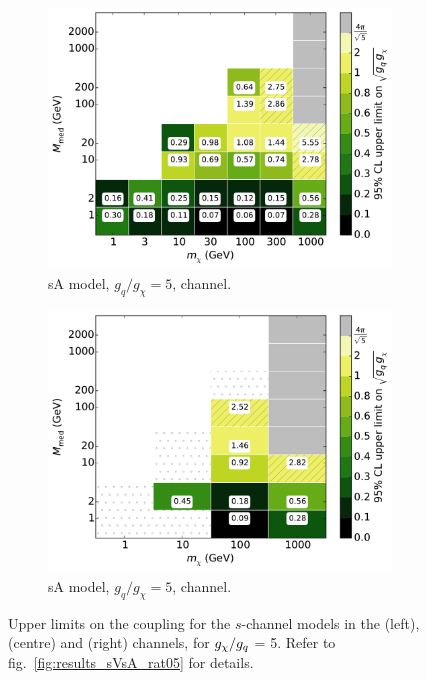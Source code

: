 \begin{figure}
\begin{subfigure}[t]{0.32\textwidth}
    \includegraphics[width=1.\textwidth]{figures/grid_allpoints_SAD_rat5.pdf}
    \caption{sA model, $g_q/g_{\chi} = 5$, \monoZ channel.}
  \end{subfigure}
  \begin{subfigure}[t]{0.32\textwidth}
    \centering
    \includegraphics[width=1.\textwidth]{figures/grid_basepoints_SAD_rat5_monoWZ.pdf}
    \caption{sA model, $g_q/g_{\chi} = 5$, \monoWZ channel.}
  \end{subfigure}
  \caption{Upper limits on the coupling for the $s$-channel models in the \monojet (left), \monoZ (centre) and \monoWZ (right) channels, for $g_{\chi} / g_q$ = 5. Refer to fig.~\ref{fig:results_sVsA_rat05} for details.}
  \label{fig:results_sVsA_rat5}
\end{figure}

